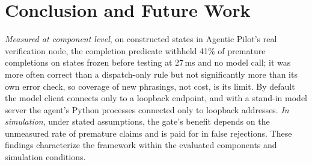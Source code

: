 \section{Conclusion and Future Work}
\label{sec:conclusion}

\emph{Measured at component level}, on constructed states in Agentic Pilot's real verification node, the completion predicate withheld 41\% of premature completions on states frozen before testing at 27\,ms and no model call; it was more often correct than a dispatch-only rule but not significantly more than its own error check, so coverage of new phrasings, not cost, is its limit. By default the model client connects only to a loopback endpoint, and with a stand-in model server the agent's Python processes connected only to loopback addresses. \emph{In simulation}, under stated assumptions, the gate's benefit depends on the unmeasured rate of premature claims and is paid for in false rejections. These findings characterize the framework within the evaluated components and simulation conditions.

